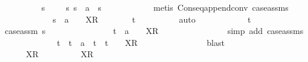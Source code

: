\begin{isabellebody}
\ \ \ \ \ \ \ \ \isamarkupfalse%
\ {\isachardoublequoteopen}s\ {\isacharequal}\ {\isacharbrackleft}{\isacharbrackright}\ {\isasymor}\ {\isacharparenleft}{\isasymexists}\ s{\isacharprime}{\isachardot}\ s\ {\isacharequal}\ a\ {\isacharhash}\ s{\isacharprime}{\isacharparenright}{\isachardoublequoteclose}\isanewline
\ \ \ \ \ \ \ \ \ \ \isamarkupfalse%
\ {\isacharparenleft}metis\ Cons{\isacharunderscore}eq{\isacharunderscore}append{\isacharunderscore}conv\ case{\isacharunderscore}assms{}{\isacharparenleft}{}{\isacharparenright}{\isacharparenright}\isanewline
\ \ \ \ \ \ \ \ \isamarkupfalse%
\ \isamarkupfalse%
\ {\isachardoublequoteopen}{\isasymexists}{\isasymsigma}{\isacharprime}{\isachardot}\ s\ {\isacharequal}\ a\ {\isacharhash}\ {\isasymrho}\ {\isacharat}\ {\isacharbrackleft}X{\isacharbrackright}\isactrlsub R\ {\isacharhash}\ {\isasymsigma}{\isacharprime}\ {\isasymand}\ {\isasymsigma}\ {\isacharequal}\ {\isasymsigma}{\isacharprime}\ {\isacharat}\ t{\isachardoublequoteclose}\isanewline
\ \ \ \ \ \ \ \ \isamarkupfalse%
\ auto\isanewline
\ \ \ \ \ \ \ \ \ \ \isamarkupfalse%
\ t{\isacharprime}\isanewline
\ \ \ \ \ \ \ \ \ \ \isamarkupfalse%
\ case{\isacharunderscore}assm{}{\isacharcolon}\ {\isachardoublequoteopen}s\ {\isacharequal}\ {\isacharbrackleft}{\isacharbrackright}{\isachardoublequoteclose}\isanewline
\ \ \ \ \ \ \ \ \ \ \isamarkupfalse%
\ \isamarkupfalse%
\ {\isachardoublequoteopen}t\ {\isacharequal}\ a\ {\isacharhash}\ {\isasymrho}\ {\isacharat}\ {\isacharbrackleft}X{\isacharbrackright}\isactrlsub R\ {\isacharhash}\ {\isasymsigma}{\isachardoublequoteclose}\isanewline
\ \ \ \ \ \ \ \ \ \ \ \ \isamarkupfalse%
\ {\isacharparenleft}simp\ add{\isacharcolon}\ case{\isacharunderscore}assms{}{\isacharparenleft}{}{\isacharparenright}{\isacharparenright}\isanewline
\ \ \ \ \ \ \ \ \ \ \isamarkupfalse%
\ \isamarkupfalse%
\ t{\isacharprime}\ \ {\isachardoublequoteopen}t\ {\isacharequal}\ a\ {\isacharhash}\ t{\isacharprime}\ {\isasymand}\ t{\isacharprime}\ {\isacharequal}\ {\isasymrho}\ {\isacharat}\ {\isacharbrackleft}X{\isacharbrackright}\isactrlsub R\ {\isacharhash}\ {\isasymsigma}{\isachardoublequoteclose}\isanewline
\ \ \ \ \ \ \ \ \ \ \ \ \isamarkupfalse%
\ blast\isanewline
\ \ \ \ \ \ \ \ \ \ \isamarkupfalse%
\ \isamarkupfalse%
\ {\isachardoublequoteopen}{\isasymexists}{\isasymsigma}{\isacharprime}{\isachardot}\ {\isacharbrackleft}{\isacharbrackright}\ {\isacharequal}\ {\isasymrho}\ {\isacharat}\ {\isacharbrackleft}X{\isacharbrackright}\isactrlsub R\ {\isacharhash}\ {\isasymsigma}{\isacharprime}\ {\isasymand}\ {\isasymsigma}\ {\isacharequal}\ {\isasymsigma}{\isacharprime}\ {\isacharat}\ {\isasymrho}\ {\isacharat}\ {\isacharbrackleft}X{\isacharbrackright}\isactrlsub R\ {\isacharhash}\ {\isasymsigma}{\isachardoublequoteclose}\isanewline

\end{isabellebody}
